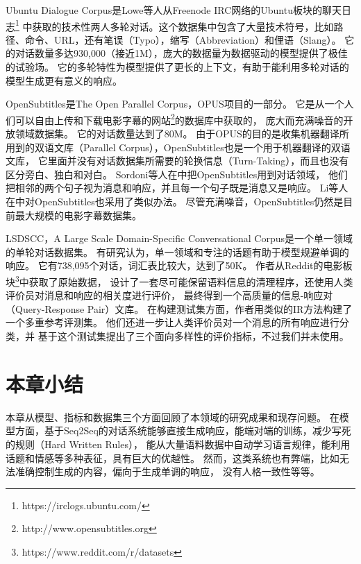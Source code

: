 Ubuntu Dialogue Corpus是Lowe等人从Freenode IRC网络的Ubuntu板块的聊天日志\footnote{https://irclogs.ubuntu.com/}
中获取的技术性两人多轮对话。这个数据集中包含了大量技术符号，比如路径、命令、URL，还有笔误（Typo），缩写（Abbreviation）和俚语（Slang）。
它的对话数量多达930,000（接近1M），庞大的数据量为数据驱动的模型提供了极佳的试验场。
它的多轮特性为模型提供了更长的上下文，有助于能利用多轮对话的模型生成更有意义的响应。

OpenSubtitles是The Open Parallel Corpus，OPUS项目的一部分。
它是从一个人们可以自由上传和下载电影字幕的网站\footnote{http://www.opensubtitles.org}的数据库中获取的，
庞大而充满噪音的开放领域数据集。
它的对话数量达到了80M。
由于OPUS的目的是收集机器翻译所用到的双语文库（Parallel Corpus），OpenSubtitles也是一个用于机器翻译的双语文库，
它里面并没有对话数据集所需要的轮换信息（Turn-Taking），而且也没有区分旁白、独白和对白。
Sordoni等人在\cite{GoogleChatbot}中把OpenSubtitles用到对话领域，
他们把相邻的两个句子视为消息和响应，并且每一个句子既是消息又是响应。
Li等人在\cite{MMI,persona,Future,DiverseBeam,
Distill,deep_RL,Adversarial}中对OpenSubtitles也采用了类似办法。
尽管充满噪音，OpenSubtitles仍然是目前最大规模的电影字幕数据集。

LSDSCC，A Large Scale Domain-Specific Conversational Corpus是一个单一领域的单轮对话数据集。
有研究认为，单一领域和专注的话题有助于模型规避单调的响应。
它有738,095个对话，词汇表比较大，达到了50K。
作者从Reddit的电影板块\footnote{https://www.reddit.com/r/datasets}中获取了原始数据，
设计了一套尽可能保留语料信息的清理程序，还使用人类评价员对消息和响应的相关度进行评价，
最终得到一个高质量的信息-响应对（Query-Response Pair）文库。
在构建测试集方面，作者用类似\cite{DCGM}的IR方法构建了一个多重参考评测集。
他们还进一步让人类评价员对一个消息的所有响应进行分类，并
基于这个测试集提出了三个面向多样性的评价指标，不过我们并未使用。

\section{本章小结}\label{sec:rw_conclusion}
本章从模型、指标和数据集三个方面回顾了本领域的研究成果和现存问题。
在模型方面，基于Seq2Seq的对话系统能够直接生成响应，能端对端的训练，减少写死的规则（Hard Written Rules），
能从大量语料数据中自动学习语言规律，能利用话题和情感等多种表征，具有巨大的优越性。
然而，这类系统也有弊端，比如无法准确控制生成的内容，偏向于生成单调的响应，
没有人格一致性等等。

